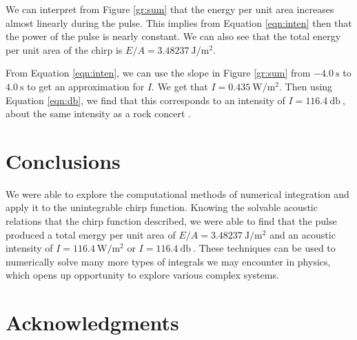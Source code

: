 \documentclass[aps,prl,twocolumn,superscriptaddress]{revtex4-1}
\begin{document}
We can interpret from Figure \ref{gr:sum} that the energy per unit area increases almost linearly during the pulse. This implies from Equation \ref{eqn:inten} then that the power of the pulse is nearly constant. We can also see that the total energy per unit area of the chirp is $E/A = \SI{3.48237}{\joule\per\m\squared}$.

From Equation \ref{eqn:inten}, we can use the slope in Figure \ref{gr:sum} from $\SI{-4.0}{\s}$ to $\SI{4.0}{\s}$ to get an approximation for $I$. We get that $I = \SI{0.435}{\watt\per\m\squared}$. Then using Equation \ref{eqn:db}, we find that this corresponds to an intensity of $I = \SI{116.4}{\decibel}~$, about the same intensity as a rock concert \cite{Laulima}.

\section{Conclusions}
We were able to explore the computational methods of numerical integration and apply it to the unintegrable chirp function. Knowing the solvable acoustic relations that the chirp function described, we were able to find that the pulse produced a total energy per unit area of $E/A = \SI{3.48237}{\joule\per\m\squared}$ and an acoustic intensity of $I = \SI{116.4}{\watt\per\m\squared}$ or $I = \SI{116.4}{\decibel}~$. These techniques can be used to numerically solve many more types of integrals we may encounter in physics, which opens up opportunity to explore various complex systems. 

\section*{Acknowledgments}
\setlength{\parindent}{0cm}



\end{document}
